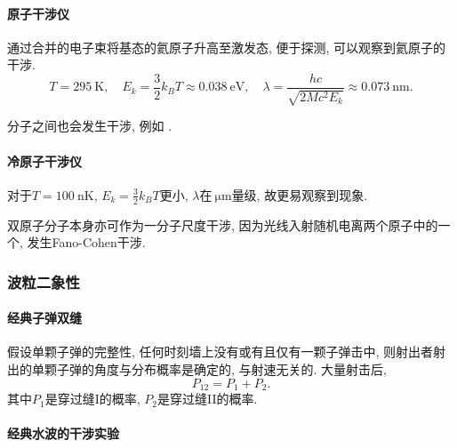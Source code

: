 \documentclass[hidelinks]{ctexart}
\begin{document}
\paragraph{原子干涉仪} %
\label{par:原子干涉仪}

通过合并的电子束将基态的氦原子升高至激发态, 便于探测, 可以观察到氦原子的干涉.
\[ T=\SI{295}{\kelvin},\quad E_k = \frac{3}{2}k_BT \approx \SI{0.038}{\eV},\quad \lambda = \frac{hc}{\sqrt{2Mc^2E_k}} \approx \SI{0.073}{\nano\meter}. \]
\begin{remark}
    分子之间也会发生干涉, 例如 .
\end{remark}


\paragraph{冷原子干涉仪} %
\label{par:冷原子干涉仪}

对于$T=\SI{100}{\nano\kelvin}$, $\displaystyle E_k = \frac{3}{2}k_BT$更小, $\lambda$在$\SI{}{\micro\meter}$量级, 故更易观察到现象.

\begin{remark}
    双原子分子本身亦可作为一分子尺度干涉, 因为光线入射随机电离两个原子中的一个, 发生Fano-Cohen干涉.
\end{remark}



\subsubsection{波粒二象性} %
\label{ssub:波粒二象性}

\paragraph{经典子弹双缝} %
\label{par:经典子弹双缝}

假设单颗子弹的完整性, 任何时刻墙上没有或有且仅有一颗子弹击中, 则射出者射出的单颗子弹的角度与分布概率是确定的, 与射速无关的. 大量射击后,
\[ P_{12} = P_1 + P_2. \]
其中$P_1$是穿过缝I的概率, $P_2$是穿过缝II的概率.


\paragraph{经典水波的干涉实验} %
\label{par:经典水波的干涉实验}
\end{document}
